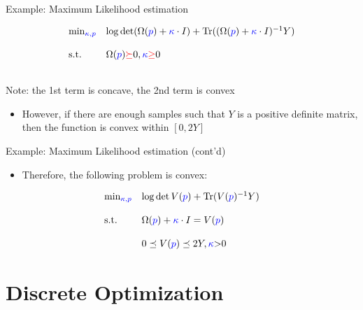 \documentclass[10pt,ignorenonframetext,serif,onlymath]{beamer}
\providecommand{\tightlist}{%
  \setlength{\itemsep}{0pt}\setlength{\parskip}{0pt}}
\begin{document}
\begin{frame}{Example: Maximum Likelihood estimation}
\protect\hypertarget{example-maximum-likelihood-estimation}{}

\[\begin{array}{ll}
      \min_{\color{blue}\kappa, p}   &      \log \det (\Omega({\color{blue}p}) + {\color{blue}\kappa}
       \cdot I) + \mathrm{Tr}((\Omega({\color{blue}p}) + {\color{blue}\kappa} \cdot I)^{-1}Y) \\\\
      \text{s.t.} & \Omega({\color{blue}p}) {\color{red}\succeq} 0, {\color{blue}\kappa} {\color{red}\geq} 0 \\\\
 \end{array}\]

Note: the 1st term is concave, the 2nd term is convex

\begin{itemize}
\tightlist
\item
  However, if there are enough samples such that \(Y\) is a positive
  definite matrix, then the function is convex within \([0, 2Y]\)
\end{itemize}

\end{frame}

\begin{frame}{Example: Maximum Likelihood estimation (cont’d)}
\protect\hypertarget{example-maximum-likelihood-estimation-contd}{}

\begin{itemize}
\tightlist
\item
  Therefore, the following problem is convex:
\end{itemize}

\[\begin{array}{ll}
      \min_{\color{blue}\kappa, p}   &   \log \det V({\color{blue}p}) + \mathrm{Tr}(V({\color{blue}p})^{-1}Y) \\\\
      \text{s.t.} & \Omega({\color{blue}p}) + {\color{blue}\kappa} \cdot I = V({\color{blue}p}) \\\\
                    & 0 \preceq V({\color{blue}p}) \preceq 2Y, {\color{blue}\kappa} {>} 0
\end{array}\]

\end{frame}

\hypertarget{discrete-optimization}{%
\section{Discrete Optimization}\label{discrete-optimization}}
\end{document}
